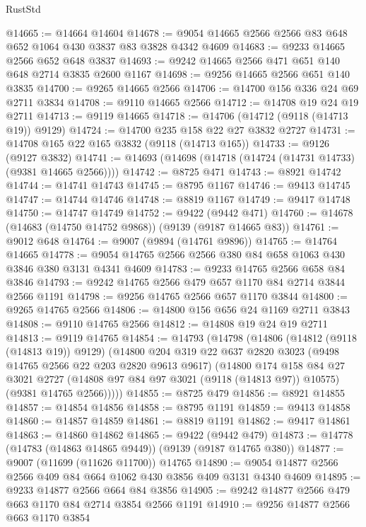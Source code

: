 \begin{lexlean}{RustStd}
\begin{coremodule}
@14665 := @14664 @14604
@14678 := @9054 @14665 @2566 @2566 @83 @648 @652 @1064 @430 @3837 @83 @3828 @4342 @4609
@14683 := @9233 @14665 @2566 @652 @648 @3837
@14693 := @9242 @14665 @2566 @471 @651 @140 @648 @2714 @3835 @2600 @1167
@14698 := @9256 @14665 @2566 @651 @140 @3835
@14700 := @9265 @14665 @2566
@14706 := @14700 @156 @336 @24 @69 @2711 @3834
@14708 := @9110 @14665 @2566
@14712 := @14708 @19 @24 @19 @2711
@14713 := @9119 @14665
@14718 := @14706 (@14712 (@9118 (@14713 @19)) @9129)
@14724 := @14700 @235 @158 @22 @27 @3832 @2727
@14731 := @14708 @165 @22 @165 @3832 (@9118 (@14713 @165))
@14733 := @9126 (@9127 @3832)
@14741 := @14693 (@14698 (@14718 (@14724 (@14731 @14733) (@9381 @14665 @2566))))
@14742 := @8725 @471
@14743 := @8921 @14742
@14744 := @14741 @14743
@14745 := @8795 @1167
@14746 := @9413 @14745
@14747 := @14744 @14746
@14748 := @8819 @1167
@14749 := @9417 @14748
@14750 := @14747 @14749
@14752 := @9422 (@9442 @471)
@14760 := @14678 (@14683 (@14750 @14752 @9868)) (@9139 (@9187 @14665 @83))
@14761 := @9012 @648
@14764 := @9007 (@9894 (@14761 @9896))
@14765 := @14764 @14665
@14778 := @9054 @14765 @2566 @2566 @380 @84 @658 @1063 @430 @3846 @380 @3131 @4341 @4609
@14783 := @9233 @14765 @2566 @658 @84 @3846
@14793 := @9242 @14765 @2566 @479 @657 @1170 @84 @2714 @3844 @2566 @1191
@14798 := @9256 @14765 @2566 @657 @1170 @3844
@14800 := @9265 @14765 @2566
@14806 := @14800 @156 @656 @24 @1169 @2711 @3843
@14808 := @9110 @14765 @2566
@14812 := @14808 @19 @24 @19 @2711
@14813 := @9119 @14765
@14854 := @14793
    (@14798
      (@14806
        (@14812 (@9118 (@14813 @19)) @9129)
        (@14800
          @204
          @319
          @22
          @637
          @2820
          @3023
          (@9498 @14765 @2566 @22 @203 @2820 @9613 @9617)
          (@14800
            @174
            @158
            @84
            @27
            @3021
            @2727
            (@14808 @97 @84 @97 @3021 (@9118 (@14813 @97)) @10575)
            (@9381 @14765 @2566)))))
@14855 := @8725 @479
@14856 := @8921 @14855
@14857 := @14854 @14856
@14858 := @8795 @1191
@14859 := @9413 @14858
@14860 := @14857 @14859
@14861 := @8819 @1191
@14862 := @9417 @14861
@14863 := @14860 @14862
@14865 := @9422 (@9442 @479)
@14873 := @14778 (@14783 (@14863 @14865 @9449)) (@9139 (@9187 @14765 @380))
@14877 := @9007 (@11699 (@11626 @11700)) @14765
@14890 := @9054 @14877 @2566 @2566 @409 @84 @664 @1062 @430 @3856 @409 @3131 @4340 @4609
@14895 := @9233 @14877 @2566 @664 @84 @3856
@14905 := @9242 @14877 @2566 @479 @663 @1170 @84 @2714 @3854 @2566 @1191
@14910 := @9256 @14877 @2566 @663 @1170 @3854

\end{coremodule}
\end{lexlean}
